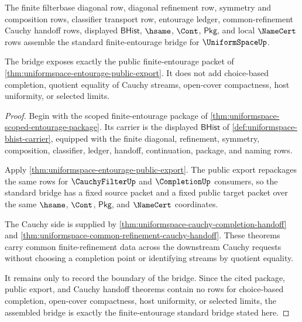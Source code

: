 \begin{theorem}
\label{thm:uniformspace-standard-bridge}
The finite filterbase diagonal row, diagonal refinement row, symmetry and
composition rows, classifier transport row, entourage ledger,
common-refinement Cauchy handoff rows, displayed $\mathsf{BHist}$, $\hsame$,
$\Cont$, $\mathsf{Pkg}$, and local $\NameCert$ rows assemble the standard
finite-entourage bridge for $\UniformSpaceUp$.

The bridge exposes exactly the public finite-entourage packet of
\autoref{thm:uniformspace-entourage-public-export}. It does not add
choice-based completion, quotient equality of Cauchy streams, open-cover
compactness, host uniformity, or selected limits.
\end{theorem}
\begin{proof}
Begin with the scoped finite-entourage package of
\autoref{thm:uniformspace-scoped-entourage-package}. Its carrier is the
displayed $\mathsf{BHist}$ of \autoref{def:uniformspace-bhist-carrier},
equipped with the finite diagonal, refinement, symmetry, composition,
classifier, ledger, handoff, continuation, package, and naming rows.

Apply \autoref{thm:uniformspace-entourage-public-export}. The public export
repackages the same rows for $\CauchyFilterUp$ and $\CompletionUp$ consumers,
so the standard bridge has a fixed source packet and a fixed public target
packet over the same $\hsame$, $\Cont$, $\mathsf{Pkg}$, and $\NameCert$
coordinates.

The Cauchy side is supplied by
\autoref{thm:uniformspace-cauchy-completion-handoff} and
\autoref{thm:uniformspace-common-refinement-cauchy-handoff}. These theorems
carry common finite-refinement data across the downstream Cauchy requests
without choosing a completion point or identifying streams by quotient
equality.

It remains only to record the boundary of the bridge. Since the cited package,
public export, and Cauchy handoff theorems contain no rows for choice-based
completion, open-cover compactness, host uniformity, or selected limits, the
assembled bridge is exactly the finite-entourage standard bridge stated here.
\end{proof}

